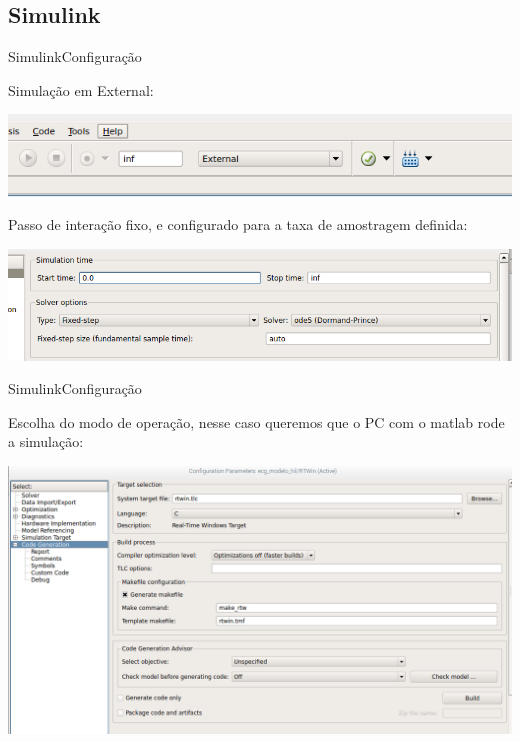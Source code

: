 \documentclass{beamer}
\begin{document}
\subsection{Simulink}


\begin{frame}{Simulink}{Configuração}	

Simulação em External:

\begin{center}
\includegraphics[width=0.7\linewidth]{simulink_config}
\end{center}

Passo de interação fixo, e configurado para a taxa de amostragem definida:

\begin{center}
\includegraphics[width=0.7\linewidth]{simulink_config2}
\end{center}
\end{frame}

\begin{frame}{Simulink}{Configuração}	
	
	Escolha do modo de operação, nesse caso queremos que o PC com o matlab rode a simulação:

	\begin{center}
	\includegraphics[width=1\linewidth]{simulink_config3}
	\end{center}
\end{frame}
\end{document}
